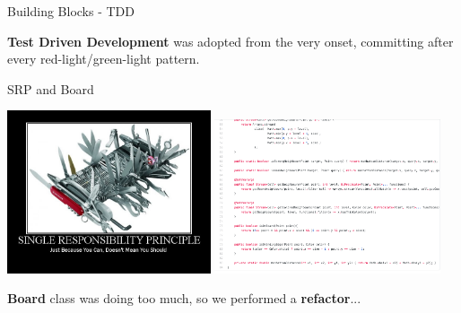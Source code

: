 \documentclass{beamer}
\begin{document}
    \begin{frame}{Building Blocks - TDD}

    \begin{centering}


     \end{centering}

     \vspace{1em}

     \textbf{Test Driven Development} was adopted from the very onset, committing after every red-light/green-light pattern.

     \end{frame}


     \begin{frame}{SRP and Board}

     {\includegraphics[width=0.45\textwidth]{img/singleresponsibilityprinciple.jpg}}
       	  {\includegraphics[width=0.5\textwidth]{img/Board.png}}

        \vspace{3em}

        \textbf{Board} class was doing too much, so we performed a \textbf{refactor}...

     \end{frame}
\end{document}
